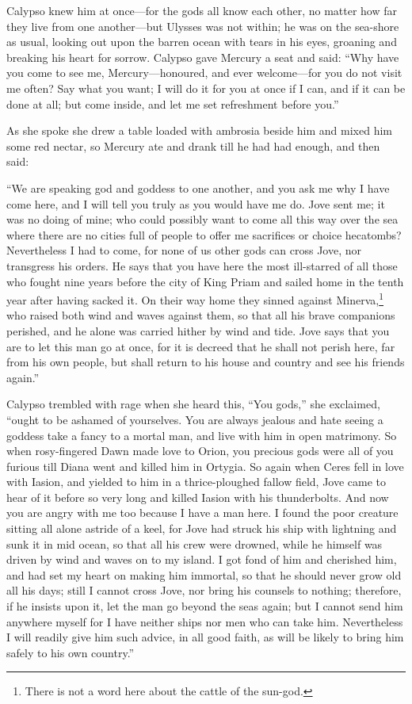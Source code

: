 Calypso knew him at once—for the gods all know each other, no matter how far
they live from one another—but Ulysses was not within; he was on the sea-shore
as usual, looking out upon the barren ocean with tears in his eyes, groaning
and breaking his heart for sorrow. Calypso gave Mercury a seat and said: “Why
have you come to see me, Mercury—honoured, and ever welcome—for you do not
visit me often? Say what you want; I will do it for you at once if I can, and
if it can be done at all; but come inside, and let me set refreshment before
you.”

As she spoke she drew a table loaded with ambrosia beside him and mixed him
some red nectar, so Mercury ate and drank till he had had enough, and then
said:

“We are speaking god and goddess to one another, and you ask me why I have come
here, and I will tell you truly as you would have me do. Jove sent me; it was
no doing of mine; who could possibly want to come all this way over the sea
where there are no cities full of people to offer me sacrifices or choice
hecatombs? Nevertheless I had to come, for none of us other gods can cross
Jove, nor transgress his orders. He says that you have here the most
ill-starred of all those who fought nine years before the city of King Priam
and sailed home in the tenth year after having sacked it. On their way home
they sinned against Minerva,\footnote{There is not a word here about the cattle of the sun-god.} who raised both wind and waves
against them, so that all his brave companions perished, and he alone was
carried hither by wind and tide. Jove says that you are to let this man go at
once, for it is decreed that he shall not perish here, far from his own people,
but shall return to his house and country and see his friends again.”

Calypso trembled with rage when she heard this, “You gods,” she exclaimed,
“ought to be ashamed of yourselves. You are always jealous and hate seeing a
goddess take a fancy to a mortal man, and live with him in open matrimony. So
when rosy-fingered Dawn made love to Orion, you precious gods were all of you
furious till Diana went and killed him in Ortygia. So again when Ceres fell in
love with Iasion, and yielded to him in a thrice-ploughed fallow field, Jove
came to hear of it before so very long and killed Iasion with his thunderbolts.
And now you are angry with me too because I have a man here. I found the poor
creature sitting all alone astride of a keel, for Jove had struck his ship with
lightning and sunk it in mid ocean, so that all his crew were drowned, while he
himself was driven by wind and waves on to my island. I got fond of him and
cherished him, and had set my heart on making him immortal, so that he should
never grow old all his days; still I cannot cross Jove, nor bring his counsels
to nothing; therefore, if he insists upon it, let the man go beyond the seas
again; but I cannot send him anywhere myself for I have neither ships nor men
who can take him. Nevertheless I will readily give him such advice, in all good
faith, as will be likely to bring him safely to his own country.”

